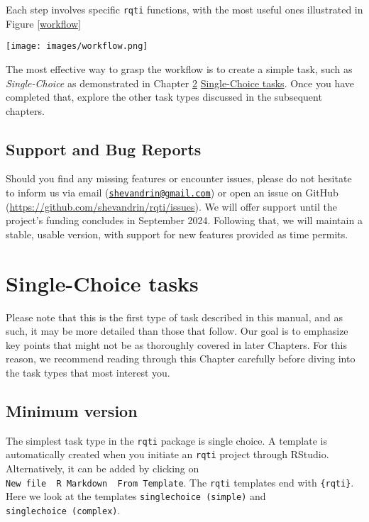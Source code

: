 \documentclass[twoside]{tufte-book}
\begin{document}
Each step involves specific \texttt{rqti} functions, with the most useful ones illustrated in Figure \ref{workflow}

\begin{figure*}
\centering
\texttt{[image: images/workflow.png]}
\caption{\label{workflow}Basic workflow to create tasks and tests with rqti}
\end{figure*}

The most effective way to grasp the workflow is to create a simple task, such as \emph{Single-Choice} as demonstrated in Chapter \ref{single-choice-tasks} \href{Chapters/singlechoice.html}{Single-Choice tasks}. Once you have completed that, explore the other task types discussed in the subsequent chapters.

\section{Support and Bug Reports}\label{support-and-bug-reports}

Should you find any missing features or encounter issues, please do not hesitate to inform us via email (\href{mailto:shevandrin@gmail.com}{\nolinkurl{shevandrin@gmail.com}}) or open an issue on GitHub (\url{https://github.com/shevandrin/rqti/issues}). We will offer support until the project's funding concludes in September 2024. Following that, we will maintain a stable, usable version, with support for new features provided as time permits.

\chapter{Single-Choice tasks}\label{single-choice-tasks}

Please note that this is the first type of task described in this manual, and as such, it may be more detailed than those that follow. Our goal is to emphasize key points that might not be as thoroughly covered in later Chapters. For this reason, we recommend reading through this Chapter carefully before diving into the task types that most interest you.

\section{Minimum version}\label{minimum-version}

The simplest task type in the \texttt{rqti} package is single choice. A template is automatically created when you initiate an \texttt{rqti} project through RStudio. Alternatively, it can be added by clicking on \texttt{New\ file\ \textrightarrow{}\ R\ Markdown\ \textrightarrow{}\ From\ Template}. The \texttt{rqti} templates end with \texttt{\{rqti\}}. Here we look at the templates \texttt{singlechoice\ (simple)} and \texttt{singlechoice\ (complex)}.
\end{document}
